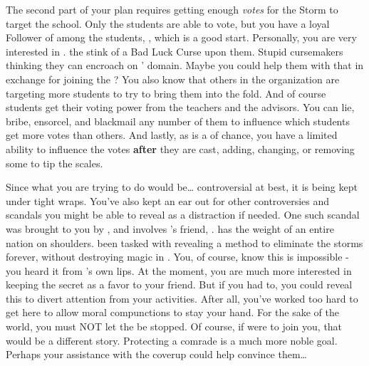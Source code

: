 \documentclass[char]{GL2020}
\begin{document}
The second part of your plan requires getting enough \emph{votes} for the Storm to target the school. Only the students are able to vote, but you have a loyal Follower of \cGenesis{} among the students, \cChupStudent{}, which is a good start. Personally, you are very interested in \cInitiate{\full}. \cInitiate{\They} \cInitiate{\have} the stink of a Bad Luck Curse upon them. Stupid \pFarm{} cursemakers thinking they can encroach on \cGenesis{}' domain. Maybe you could help them with that in exchange for joining the \pGoaties{}? You also know that others in the organization are targeting more students to try to bring them into the fold. And of course students get their voting power from the teachers and the advisors. You can lie, bribe, ensorcel, and blackmail any number of them to influence which students get more votes than others. And lastly, as \cGenesis{} is a \cGenesis{\God} of chance, you have a limited ability to influence the votes \textbf{after} they are cast, adding, changing, or removing some to tip the scales.

Since what you are trying to do would be\ldots{} controversial at best, it is being kept under tight wraps. You've also kept an ear out for other controversies and scandals you might be able to reveal as a distraction if needed. One such scandal was brought to you by \cChupInventor{}, and involves \cChupInventor{}'s friend, \cHeadScientist{\full}. \cHeadScientist{} has the weight of an entire nation on \cHeadScientist{\their} shoulders. \cHeadScientist{\They} \cHeadScientist{\have} been tasked with revealing a method to eliminate the storms forever, without destroying magic in \pEarth{}. You, of course, know this is impossible - you heard it from \cGenesis{}'s own lips. At the moment, you are much more interested in keeping the secret as a favor to your friend. But if you had to, you could reveal this to divert attention from your activities. After all, you've worked too hard to get here to allow moral compunctions to stay your hand. For the sake of the world, you must NOT let the \pGoaties{} be stopped. Of course, if \cHeadScientist{} were to join you, that would be a different story. Protecting a comrade is a much more noble goal. Perhaps your assistance with the coverup could help convince them\ldots{}
\end{document}
